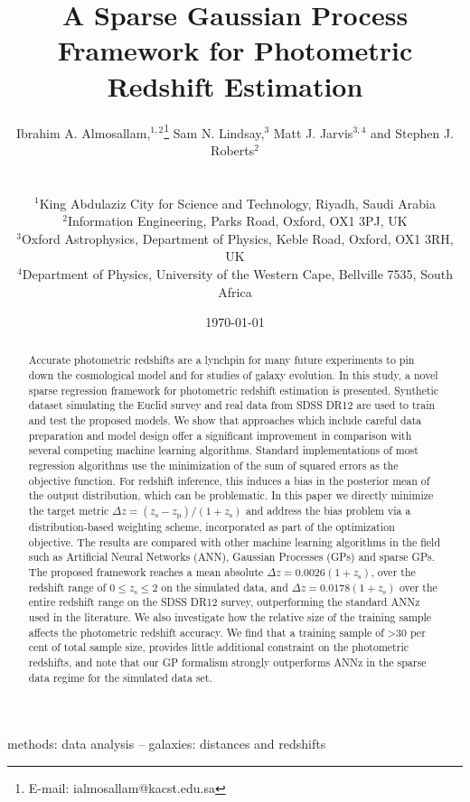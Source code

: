 \documentclass[useAMS,usenatbib,fleqn]{mn2e}
\title[A Sparse GP Framework for Photometric Redshift]{A Sparse Gaussian Process Framework for Photometric Redshift Estimation}
\author[Almosallam et al.]
{\parbox{\textwidth}{Ibrahim A. Almosallam,$^{1,2}$\thanks{E-mail: ialmosallam@kacst.edu.sa} Sam N. Lindsay,$^{3}$ Matt J. Jarvis$^{3,4}$ and Stephen J. Roberts$^{2}$
}
\vspace{0.4cm}\\
\parbox{\textwidth}{
$^1$King Abdulaziz City for Science and Technology, Riyadh, Saudi Arabia\\
$^2$Information Engineering, Parks Road, Oxford, OX1 3PJ, UK\\
$^3$Oxford Astrophysics, Department of Physics, Keble Road, Oxford, OX1 3RH, UK\\
$^4$Department of Physics, University of the Western Cape, Bellville 7535, South Africa\\
}}
\begin{document}
\date{\today}

\pagerange{\pageref{firstpage}--\pageref{lastpage}} 

\maketitle

\label{firstpage}

\begin{abstract}
Accurate photometric redshifts are a lynchpin for many future experiments to pin down the cosmological model and for studies of galaxy evolution. In this study, a novel sparse regression framework for photometric redshift estimation is presented. Synthetic dataset simulating the Euclid survey and real data from SDSS DR12 are used to train and test the proposed models. We show that approaches which include careful data preparation and model design offer a significant improvement in comparison with several competing machine learning algorithms. Standard implementations of most regression algorithms use the minimization of the sum of squared errors as the objective function. For redshift inference, this induces a bias in the posterior mean of the output distribution, which can be problematic. In this paper we directly minimize the target metric $\Delta z = (z_\textrm{s} - z_\textrm{p})/(1+z_\textrm{s})$ and address the bias problem via a distribution-based weighting scheme, incorporated as part of the optimization objective. The results are compared with other machine learning algorithms in the field such as Artificial Neural Networks (ANN), Gaussian Processes (GPs) and sparse GPs. The proposed framework reaches a mean absolute $\Delta z = 0.0026(1+z_\textrm{s})$, over the redshift range of $0 \le z_\textrm{s} \le 2$ on the simulated data, and $\Delta z = 0.0178(1+z_\textrm{s})$ over the entire redshift range on the SDSS DR12 survey, outperforming the standard {\sc ANNz} used in the literature. We also investigate how the relative size of the training sample affects the photometric redshift accuracy. We find that a training sample of \textgreater 30 per cent of total sample size, provides little additional constraint on the photometric redshifts, and note that our GP formalism strongly outperforms {\sc ANNz} in the sparse data regime for the simulated data set.

\end{abstract}

\begin{keywords}
methods: data analysis -- galaxies: distances and redshifts
\end{keywords}
\end{document}
